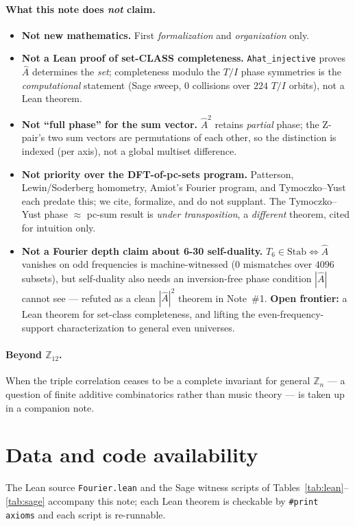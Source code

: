 \documentclass[11pt]{article}
\newcommand{\lean}[1]{\texttt{#1}}
\newcommand{\Ztwelve}{\mathbb{Z}_{12}}
\newcommand{\Zn}[1]{\mathbb{Z}_{#1}}
\newcommand{\Ahat}{\hat{A}}
\newcommand{\Stab}{\mathrm{Stab}}
\begin{document}
\paragraph{What this note does \emph{not} claim.}
\begin{itemize}\itemsep2pt
  \item \textbf{Not new mathematics.} First \emph{formalization} and \emph{organization} only.
  \item \textbf{Not a Lean proof of set-CLASS completeness.} \lean{Ahat\_injective} proves $\Ahat$
        determines the \emph{set}; completeness modulo the $T/I$ phase symmetries is the
        \emph{computational} statement (Sage sweep, $0$ collisions over $224$ $T/I$ orbits), not a Lean
        theorem.
  \item \textbf{Not ``full phase'' for the sum vector.} $\Ahat^2$ retains \emph{partial} phase; the
        Z-pair's two sum vectors are permutations of each other, so the distinction is indexed (per axis),
        not a global multiset difference.
  \item \textbf{Not priority over the DFT-of-pc-sets program.} Patterson, Lewin/Soderberg homometry,
        Amiot's Fourier program, and Tymoczko--Yust~\cite{TY} each predate this; we cite, formalize, and do
        not supplant. The Tymoczko--Yust phase $\approx$ pc-sum result is \emph{under transposition}, a
        \emph{different} theorem, cited for intuition only.
  \item \textbf{Not a Fourier depth claim about 6-30 self-duality.} $T_6\in\Stab\iff\Ahat$ vanishes on odd
        frequencies is machine-witnessed ($0$ mismatches over $4096$ subsets), but self-duality also needs
        an inversion-free phase condition $|\Ahat|$ cannot see --- refuted as a clean $|\Ahat|^2$ theorem
        in Note~\#1. \textbf{Open frontier:} a Lean theorem for set-class completeness, and lifting the
        even-frequency-support characterization to general even universes.
\end{itemize}

\paragraph{Beyond $\Ztwelve$.} When the triple correlation ceases to be a complete invariant for general
$\Zn{n}$ --- a question of finite additive combinatorics rather than music theory --- is taken up in a
companion note.

\section*{Data and code availability}
The Lean source \lean{Fourier.lean} and the Sage witness scripts of Tables~\ref{tab:lean}--\ref{tab:sage}
accompany this note; each Lean theorem is checkable by \lean{\#print axioms} and each script is
re-runnable.
\end{document}
